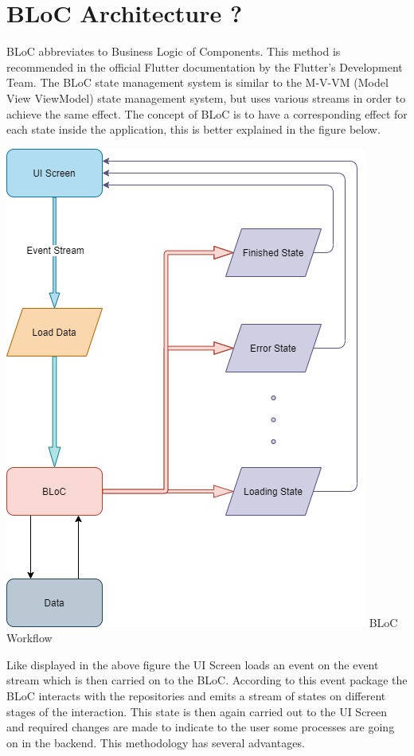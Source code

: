\documentclass[conference]{IEEEtran}
\newenvironment{Figure}
  {\par\medskip\noindent\minipage{\linewidth}}
  {\endminipage\par\medskip}
\begin{document}
\section{BLoC Architecture ?}
BLoC abbreviates to Business Logic of Components. This method is
recommended in the official Flutter documentation by the Flutter's
Development Team. The BLoC state management system is similar to
the M-V-VM (Model View ViewModel) state management system\cite{[12]}, but uses
various streams in order to achieve the same effect. The concept
of BLoC is to have a corresponding effect for each state inside the
application, this is better explained in the figure below.

\begin{Figure}
  \centering
  \includegraphics[width=\linewidth]{Images/BLoC_Example.drawio.png}
  \label{blocFig}
  \figurename{BLoC Workflow}
\end{Figure}

Like displayed in the above figure the UI Screen loads an event on the
event stream which is then carried on to the BLoC. According to this
event package the BLoC interacts with the repositories and emits a
stream of states on different stages of the interaction. This state
is then again carried out to the UI Screen and required changes are
made to indicate to the user some processes are going on in the
backend. This methodology has several advantages.
\end{document}
